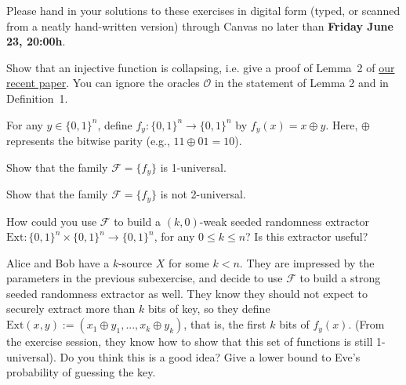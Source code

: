 \documentclass[a4paper,10pt,landscape,twocolumn]{scrartcl}
\newcommand\deadline{Friday June 23, 20:00h}
\begin{document}
\newcommand{\Hmin}{\mathrm{H}_{\mathrm{min}}}

\homeworkproblems

{\sffamily\noindent
Please hand in your solutions to these exercises in digital form (typed, or scanned from a neatly hand-written version) through Canvas no later than \textbf{\deadline}.  %
}
\begin{exercise}
Show that an injective function is collapsing, i.e. give a proof of Lemma~2 of \href{http://homepages.cwi.nl/~schaffne/spool/sponges.pdf}{our recent paper}. You can ignore the oracles $\mathcal{O}$ in the statement of Lemma 2 and in Definition~1.
\end{exercise}


\begin{exercise}
	For any $y \in \{0,1\}^n$, define $f_y : \{0,1\}^n \to \{0,1\}^n$ by $f_y(x) = x \oplus y$. Here, $\oplus$ represents the bitwise parity (e.g., $11 \oplus 01 = 10$).
	\begin{subex}
		Show that the family $\mathscr{F} = \{f_y\}$ is 1-universal.
	\end{subex}
    \begin{subex}
        Show that the family $\mathscr{F} = \{f_y\}$ is not 2-universal.
    \end{subex}
    \begin{subex}
    	How could you use $\mathscr{F}$ to build a $(k,0)$-weak seeded randomness extractor $\text{Ext} : \{0,1\}^n \times \{0,1\}^n \to \{0,1\}^n$, for any $0 \leq k \leq n$? Is this extractor useful?
    \end{subex}
    \begin{subex}
    	Alice and Bob have a $k$-source $X$ for some $k < n$. They are impressed by the parameters in the previous subexercise, and decide to use $\mathscr{F}$ to build a strong seeded randomness extractor as well. They know they should not expect to securely extract more than $k$ bits of key, so they define $\text{Ext}(x,y) := (x_1 \oplus y_1, ..., x_k \oplus y_k)$, that is, the first $k$ bits of $f_y(x)$. (From the exercise session, they know how to show that this set of functions is still 1-universal). Do you think this is a good idea? Give a lower bound to Eve's probability of guessing the key.
    \end{subex}
\end{exercise}
\end{document}
